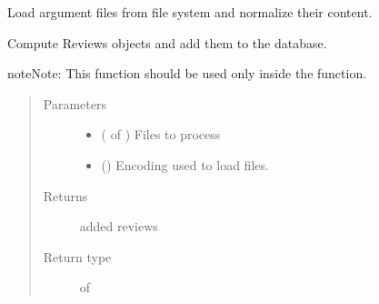 \documentclass[letterpaper,10pt,english]{sphinxmanual}
\begin{document}
\begin{fulllineitems}
\label{\detokenize{process:loacore.process.review_process.add_reviews_from_files}}
Load argument files from file system and normalize their content.

Compute Reviews objects and add them to the database.

\begin{sphinxadmonition}{note}{Note:}
This function should be used only inside the {\hyperref[\detokenize{process:loacore.process.file_process.add_files}]{}} function.
\end{sphinxadmonition}
\begin{quote}\begin{description}
\item[{Parameters}] \leavevmode\begin{itemize}
\item {} 
 ( of {\hyperref[\detokenize{classes:loacore.classes.classes.File}]{}}) \textendash{} Files to process

\item {} 
 () \textendash{} Encoding used to load files.

\end{itemize}

\item[{Returns}] \leavevmode
added reviews

\item[{Return type}] \leavevmode
{} of {\hyperref[\detokenize{classes:loacore.classes.classes.Review}]{}}

\end{description}\end{quote}

\end{fulllineitems}

\end{document}
